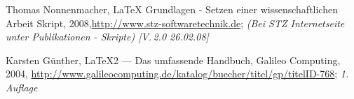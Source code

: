 \begin{thebibliography}{XXXX}
 Thomas Nonnenmacher, LaTeX Grundlagen - Setzen einer wissenschaftlichen Arbeit Skript, 2008,\url{http://www.stz-softwaretechnik.de}; \textit{(Bei STZ Internetseite unter Publikationen - Skripte) [V.\,2.0 26.02.08]}

 Karsten Günther, LaTeX2 --- Das umfassende Handbuch, Galileo Computing, 2004, \url{http://www.galileocomputing.de/katalog/buecher/titel/gp/titelID-768}; \textit{1. Auflage}
\end{thebibliography}
